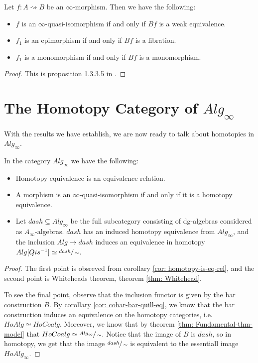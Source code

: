 \documentclass[../thesis.tex]{subfiles}
\begin{document}
        \begin{proposition}
            Let $f : A \rightsquigarrow B$ be an $\infty$-morphism. Then we have the following:
            \begin{itemize}
                \item $f$ is an $\infty$-quasi-isomorphism if and only if $Bf$ is a weak equivalence.
                \item $f_1$ is an epimorphism if and only if $Bf$ is a fibration.
                \item $f_1$ is a monomorphism if and only if $Bf$ is a monomorphism.
            \end{itemize}
        \end{proposition}

        \begin{proof}
            This is proposition 1.3.3.5 in \cite{LefevreHasegawa03}.
        \end{proof}

    \section{The Homotopy Category of $Alg_\infty$}

    With the results we have establish, we are now ready to talk about homotopies in $Alg_\infty$.

    \begin{thm}
        In the category $Alg_\infty$ we have the following:
        \begin{itemize}
            \item Homotopy equivalence is an equivalence relation.
            \item A morphism is an $\infty$-quasi-isomorphism if and only if it is a homotopy equivalence.
            \item Let $dash \subseteq Alg_\infty$ be the full subcategory consisting of dg-algebras considered as $A_\infty$-algebras. $dash$ has an induced homotopy equivalence from $Alg_\infty$, and the inclusion $Alg \rightarrow dash$ induces an equivalence in homotopy $Alg[Qis^{-1}] \simeq \sfrac{dash}{\sim}$.
        \end{itemize}
    \end{thm}

    \begin{proof}
        The first point is obsreved from corollary \ref{cor: homotopy-is-eq-rel}, and the second point is Whiteheads theorem, theorem \ref{thm: Whitehead}.

        To see the final point, observe that the inclusion functor is given by the bar construction $B$. By corollary \ref{cor: cobar-bar-quill-eq}, we know that the bar construction induces an equivalence on the homotopy categories, i.e. $HoAlg \simeq HoCoalg$. Moreover, we know that by theorem \ref{thm: Fundamental-thm-model} that $HoCoalg \simeq \sfrac{Alg_\infty}{\sim}$. Notice that the image of $B$ is $dash$, so in homotopy, we get that the image $\sfrac{dash}{\sim}$ is equivalent to the essentiall image $HoAlg_\infty$.
    \end{proof}
\end{document}
